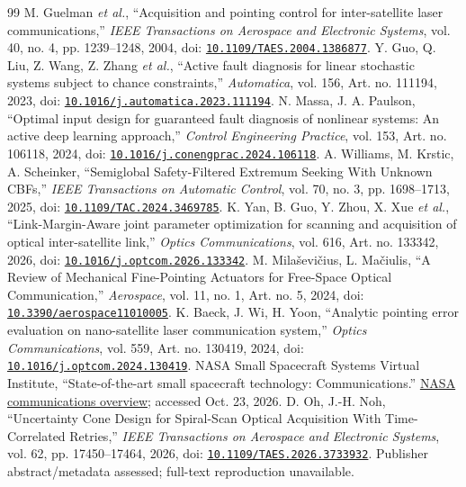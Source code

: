 \begin{thebibliography}{99}
 M. Guelman \emph{et al.}, ``Acquisition and pointing control for inter-satellite laser communications,'' \emph{IEEE Transactions on Aerospace and Electronic Systems}, vol. 40, no. 4, pp. 1239--1248, 2004, doi: \href{https://doi.org/10.1109/TAES.2004.1386877}{\nolinkurl{10.1109/TAES.2004.1386877}}.
 Y. Guo, Q. Liu, Z. Wang, Z. Zhang \emph{et al.}, ``Active fault diagnosis for linear stochastic systems subject to chance constraints,'' \emph{Automatica}, vol. 156, Art. no. 111194, 2023, doi: \href{https://doi.org/10.1016/j.automatica.2023.111194}{\nolinkurl{10.1016/j.automatica.2023.111194}}.
 N. Massa, J. A. Paulson, ``Optimal input design for guaranteed fault diagnosis of nonlinear systems: An active deep learning approach,'' \emph{Control Engineering Practice}, vol. 153, Art. no. 106118, 2024, doi: \href{https://doi.org/10.1016/j.conengprac.2024.106118}{\nolinkurl{10.1016/j.conengprac.2024.106118}}.
 A. Williams, M. Krstic, A. Scheinker, ``Semiglobal Safety-Filtered Extremum Seeking With Unknown CBFs,'' \emph{IEEE Transactions on Automatic Control}, vol. 70, no. 3, pp. 1698--1713, 2025, doi: \href{https://doi.org/10.1109/TAC.2024.3469785}{\nolinkurl{10.1109/TAC.2024.3469785}}.
 K. Yan, B. Guo, Y. Zhou, X. Xue \emph{et al.}, ``Link-Margin-Aware joint parameter optimization for scanning and acquisition of optical inter-satellite link,'' \emph{Optics Communications}, vol. 616, Art. no. 133342, 2026, doi: \href{https://doi.org/10.1016/j.optcom.2026.133342}{\nolinkurl{10.1016/j.optcom.2026.133342}}.
 M. Milaševičius, L. Mačiulis, ``A Review of Mechanical Fine-Pointing Actuators for Free-Space Optical Communication,'' \emph{Aerospace}, vol. 11, no. 1, Art. no. 5, 2024, doi: \href{https://doi.org/10.3390/aerospace11010005}{\nolinkurl{10.3390/aerospace11010005}}.
 K. Baeck, J. Wi, H. Yoon, ``Analytic pointing error evaluation on nano-satellite laser communication system,'' \emph{Optics Communications}, vol. 559, Art. no. 130419, 2024, doi: \href{https://doi.org/10.1016/j.optcom.2024.130419}{\nolinkurl{10.1016/j.optcom.2024.130419}}.
 NASA Small Spacecraft Systems Virtual Institute, ``State-of-the-art small spacecraft technology: Communications.'' \href{https://www.nasa.gov/smallsat-institute/sst-soa/soa-communications/}{NASA communications overview}; accessed Oct. 23, 2026.
 D. Oh, J.-H. Noh, ``Uncertainty Cone Design for Spiral-Scan Optical Acquisition With Time-Correlated Retries,'' \emph{IEEE Transactions on Aerospace and Electronic Systems}, vol. 62, pp. 17450--17464, 2026, doi: \href{https://doi.org/10.1109/TAES.2026.3733932}{\nolinkurl{10.1109/TAES.2026.3733932}}. Publisher abstract/metadata assessed; full-text reproduction unavailable.

\end{thebibliography}
